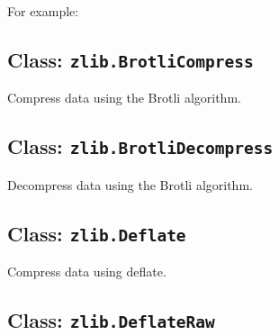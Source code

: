 For example:

\begin{Shaded}
\begin{Highlighting}[]
\OperatorTok{=}\NormalTok{(\{}
  \OperatorTok{:}  \OperatorTok{*} \OperatorTok{,}
  \OperatorTok{:}\NormalTok{ \{}
\NormalTok{    [zlib}\NormalTok{]}\OperatorTok{:}\OperatorTok{,}
\NormalTok{    [zlib}\NormalTok{]}\OperatorTok{:} \OperatorTok{,}
\NormalTok{    [zlib}\NormalTok{]}\OperatorTok{:}\OperatorTok{,}
\NormalTok{  \}}\OperatorTok{,}
\NormalTok{\})}\OperatorTok{;}
\end{Highlighting}
\end{Shaded}

\subsection{\texorpdfstring{Class:
\texttt{zlib.BrotliCompress}}{Class: zlib.BrotliCompress}}\label{class-zlib.brotlicompress}

Compress data using the Brotli algorithm.

\subsection{\texorpdfstring{Class:
\texttt{zlib.BrotliDecompress}}{Class: zlib.BrotliDecompress}}\label{class-zlib.brotlidecompress}

Decompress data using the Brotli algorithm.

\subsection{\texorpdfstring{Class:
\texttt{zlib.Deflate}}{Class: zlib.Deflate}}\label{class-zlib.deflate}

Compress data using deflate.

\subsection{\texorpdfstring{Class:
\texttt{zlib.DeflateRaw}}{Class: zlib.DeflateRaw}}\label{class-zlib.deflateraw}

